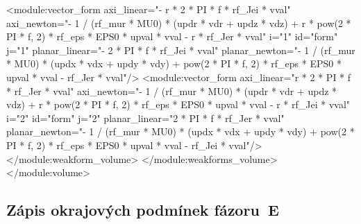 \documentclass[12pt,a4paper,oneside]{article}
\numberwithin{equation}{section} %
\numberwithin{figure}{section} %
\numberwithin{table}{section} %
\begin{document}
\begin{spverbatim}
        <module:vector_form axi_linear="- r * 2 * PI * f * rf_Jei * vval" axi_newton="- 1 / (rf_mur * MU0) * (updr * vdr + updz * vdz) + r * pow(2 * PI * f, 2) * rf_eps * EPS0 * upval * vval - r * rf_Jer * vval" i="1" id="form" j="1" planar_linear="- 2 * PI * f * rf_Jei * vval" planar_newton="- 1 / (rf_mur * MU0) * (updx * vdx + updy * vdy) + pow(2 * PI * f, 2) * rf_eps * EPS0 * upval * vval - rf_Jer * vval"/>
        <module:vector_form axi_linear="r * 2 * PI * f * rf_Jer * vval" axi_newton="- 1 / (rf_mur * MU0) * (updr * vdr + updz * vdz) + r * pow(2 * PI * f, 2) * rf_eps * EPS0 * upval * vval - r * rf_Jei * vval" i="2" id="form" j="2" planar_linear="2 * PI * f * rf_Jer * vval" planar_newton="- 1 / (rf_mur * MU0) * (updx * vdx + updy * vdy) + pow(2 * PI * f, 2) * rf_eps * EPS0 * upval * vval - rf_Jei * vval"/>
      </module:weakform_volume>
    </module:weakforms_volume>
  </module:volume>
\end{spverbatim}


\subsection*{Zápis okrajových podmínek fázoru~E}
\label{xmlEs}
\end{document}
